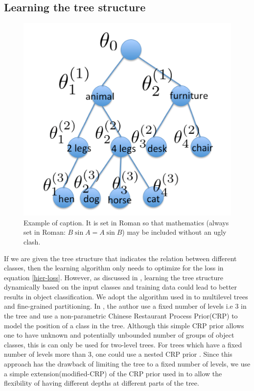 \documentclass[10pt,twocolumn,letterpaper]{article}
\begin{document}
\subsection{Learning the tree structure}
 \begin{figure}[t]
 	\begin{center}
 		\includegraphics[width=0.8\linewidth]{tree_withoutnew}
 	\end{center}
 	\caption{Example of caption.  It is set in Roman so that mathematics
 		(always set in Roman: $B \sin A = A \sin B$) may be included without an
 		ugly clash.}
 	\label{fig:long}
 	\label{fig:onecol}
 \end{figure}
If we are given the tree structure that indicates the relation between different classes, then the 
learning algorithm only needs to optimize for the loss in equation \ref{hier-loss}. However, as 
discussed in \cite{ruslan}, learning the tree structure dynamically based on the input classes and training data
could lead to better results in object classification. We adopt the algorithm used in \cite{ruslan} to multilevel trees
and fine-grained partitioning. In \cite{ruslan}, the author use a fixed number of levels i.e 3 in the tree and use
a non-parametric Chinese Restaurant Process Prior(CRP) to model the position of a class in the tree. Although this simple
CRP prior allows one to have unknown and potentially unbounded number of groups of object classes, this is can only be
used for two-level trees. For trees which have a fixed number of levels more than 3, one could use a nested CRP prior \cite{nestedCRP}.
Since this approach has the drawback of limiting the tree to a fixed number of levels, we use a simple extension(modified-CRP) of the
CRP prior used in \cite{ruslan} to allow the flexibility of  having different depths at different parts of the tree.    
\end{document}
